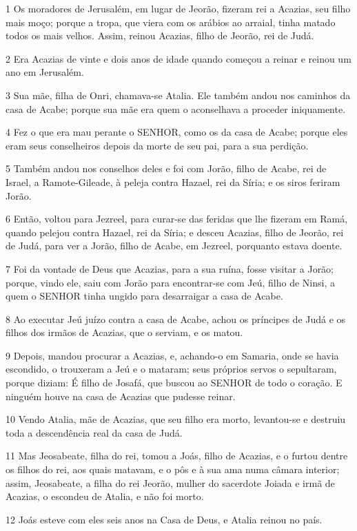 \par 1 Os moradores de Jerusalém, em lugar de Jeorão, fizeram rei a Acazias, seu filho mais moço; porque a tropa, que viera com os arábios ao arraial, tinha matado todos os mais velhos. Assim, reinou Acazias, filho de Jeorão, rei de Judá.
\par 2 Era Acazias de vinte e dois anos de idade quando começou a reinar e reinou um ano em Jerusalém.
\par 3 Sua mãe, filha de Onri, chamava-se Atalia. Ele também andou nos caminhos da casa de Acabe; porque sua mãe era quem o aconselhava a proceder iniquamente.
\par 4 Fez o que era mau perante o SENHOR, como os da casa de Acabe; porque eles eram seus conselheiros depois da morte de seu pai, para a sua perdição.
\par 5 Também andou nos conselhos deles e foi com Jorão, filho de Acabe, rei de Israel, a Ramote-Gileade, à peleja contra Hazael, rei da Síria; e os siros feriram Jorão.
\par 6 Então, voltou para Jezreel, para curar-se das feridas que lhe fizeram em Ramá, quando pelejou contra Hazael, rei da Síria; e desceu Acazias, filho de Jeorão, rei de Judá, para ver a Jorão, filho de Acabe, em Jezreel, porquanto estava doente.
\par 7 Foi da vontade de Deus que Acazias, para a sua ruína, fosse visitar a Jorão; porque, vindo ele, saiu com Jorão para encontrar-se com Jeú, filho de Ninsi, a quem o SENHOR tinha ungido para desarraigar a casa de Acabe.
\par 8 Ao executar Jeú juízo contra a casa de Acabe, achou os príncipes de Judá e os filhos dos irmãos de Acazias, que o serviam, e os matou.
\par 9 Depois, mandou procurar a Acazias, e, achando-o em Samaria, onde se havia escondido, o trouxeram a Jeú e o mataram; seus próprios servos o sepultaram, porque diziam: É filho de Josafá, que buscou ao SENHOR de todo o coração. E ninguém houve na casa de Acazias que pudesse reinar.
\par 10 Vendo Atalia, mãe de Acazias, que seu filho era morto, levantou-se e destruiu toda a descendência real da casa de Judá.
\par 11 Mas Jeosabeate, filha do rei, tomou a Joás, filho de Acazias, e o furtou dentre os filhos do rei, aos quais matavam, e o pôs e à sua ama numa câmara interior; assim, Jeosabeate, a filha do rei Jeorão, mulher do sacerdote Joiada e irmã de Acazias, o escondeu de Atalia, e não foi morto.
\par 12 Joás esteve com eles seis anos na Casa de Deus, e Atalia reinou no país.

